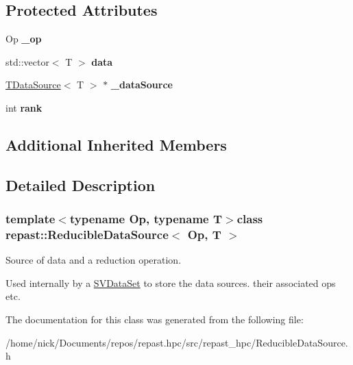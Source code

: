 \subsection*{Protected Attributes}
\begin{DoxyCompactItemize}
\item 
\hypertarget{classrepast_1_1_reducible_data_source_a26e1f75855e72a423dd5cb362f992535}{Op {\bfseries \-\_\-op}}\label{classrepast_1_1_reducible_data_source_a26e1f75855e72a423dd5cb362f992535}

\item 
\hypertarget{classrepast_1_1_reducible_data_source_ad83152c79acdf6db218591c1984af1f2}{std\-::vector$<$ T $>$ {\bfseries data}}\label{classrepast_1_1_reducible_data_source_ad83152c79acdf6db218591c1984af1f2}

\item 
\hypertarget{classrepast_1_1_reducible_data_source_a09765379b1cfb5704ec642e51aebbd74}{\hyperlink{classrepast_1_1_t_data_source}{T\-Data\-Source}$<$ T $>$ $\ast$ {\bfseries \-\_\-data\-Source}}\label{classrepast_1_1_reducible_data_source_a09765379b1cfb5704ec642e51aebbd74}

\item 
\hypertarget{classrepast_1_1_reducible_data_source_a8511ef8c34d008f18e555f17c843596e}{int {\bfseries rank}}\label{classrepast_1_1_reducible_data_source_a8511ef8c34d008f18e555f17c843596e}

\end{DoxyCompactItemize}
\subsection*{Additional Inherited Members}


\subsection{Detailed Description}
\subsubsection*{template$<$typename Op, typename T$>$class repast\-::\-Reducible\-Data\-Source$<$ Op, T $>$}

Source of data and a reduction operation. 

Used internally by a \hyperlink{classrepast_1_1_s_v_data_set}{S\-V\-Data\-Set} to store the data sources. their associated ops etc. 

The documentation for this class was generated from the following file\-:\begin{DoxyCompactItemize}
\item 
/home/nick/\-Documents/repos/repast.\-hpc/src/repast\-\_\-hpc/Reducible\-Data\-Source.\-h\end{DoxyCompactItemize}
